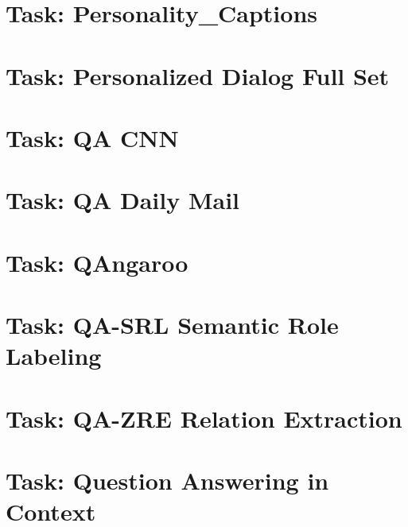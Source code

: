 \documentclass[twoside]{book}
\newcommand{\+}{\discretionary{\mbox{\scriptsize$\hookleftarrow$}}{}{}}
\begin{document}
\chapter{Task\+: Personality\+\_\+\+Captions}
\label{md_parlai_tasks_personality_captions_README}

\chapter{Task\+: Personalized Dialog Full Set}
\label{md_parlai_tasks_personalized_dialog_README}

\chapter{Task\+: QA C\+NN}
\label{md_parlai_tasks_qacnn_README}

\chapter{Task\+: QA Daily Mail}
\label{md_parlai_tasks_qadailymail_README}

\chapter{Task\+: Q\+Angaroo}
\label{md_parlai_tasks_qangaroo_README}

\chapter{Task\+: Q\+A-\/\+S\+RL Semantic Role Labeling}
\label{md_parlai_tasks_qasrl_README}

\chapter{Task\+: Q\+A-\/\+Z\+RE Relation Extraction}
\label{md_parlai_tasks_qazre_README}

\chapter{Task\+: Question Answering in Context}
\label{md_parlai_tasks_quac_README}

\end{document}
